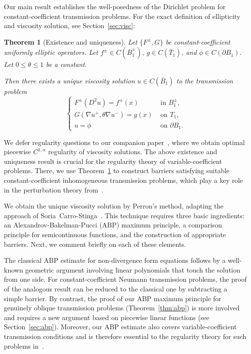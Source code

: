 \documentclass[letter,11pt]{amsart}
\newtheorem{thm}{Theorem}[section]
\theoremstyle{definition}
\numberwithin{equation}{section}
\begin{document}
\medskip

Our main result establishes the well-posedness of the Dirichlet problem for constant-coefficient transmission problems.
For the exact definition of ellipticity and viscosity solution, see Section~\ref{sec:visc}:

\begin{thm}[Existence and uniqueness]
\label{thm:wellposed}
Let $\{F^{\pm}, G\}$ be constant-coefficient uniformly elliptic operators.
Let $f^{\pm} \in C(\overline{B}_1^{\pm})$, $g \in C(\overline{T}_1)$, and $\phi \in C(\partial B_1)$.
Let $0 \leq \theta \leq 1$ be a constant.

Then there exists a unique viscosity solution $u \in C(\overline{B}_1)$ to the transmission problem
\[
\begin{cases}
F^{\pm}(D^2u) = f^{\pm}(x) & \text{ in } B_1^{\pm},\\
G(\nabla u^{+}, \theta \nabla u^{-}) =g(x) & \text{ on } T_1,\\
u = \phi & \text{ on } \partial B_1.
\end{cases}
\]
\end{thm}

\medskip

We defer regularity questions to our companion paper~\cite{E}, where we obtain optimal piecewise $C^{1,\alpha}$ regularity of viscosity solutions.
The above existence and uniqueness result is crucial for the regularity theory of variable-coefficient problems.
There, we use Theorem~\ref{thm:wellposed} to construct barriers satisfying suitable constant-coefficient inhomogeneous transmission problems, which play a key role in the perturbation theory from~\cite{E}.

\medskip

We obtain the unique viscosity solution by Perron's method, adapting the approach of Soria~Carro-Stinga~\cite[Section 4]{SS}.
This technique requires three basic ingredients: an Alexandrov-Bakelman-Pucci (ABP) maximum principle, a comparison principle for semicontinuous functions, and the construction of appropriate barriers.
Next, we comment briefly on each of these elements.

\medskip

The classical ABP estimate for non-divergence form equations follows by a well-known geometric argument involving linear polynomials that touch the solution from one side.
For constant-coefficient Neumann transmission problems, the proof of the analogous result can be reduced to the classical one by subtracting a simple barrier.
By contrast, the proof of our ABP maximum principle for genuinely oblique transmission problems (Theorem~\ref{thm:abp}) is more involved and requires a new argument based on piecewise linear functions (see Section~\ref{sec:abp}).
Moreover, our ABP estimate also covers variable-coefficient transmission conditions and is therefore essential to the regularity theory for such problems in~\cite{E}.
\end{document}
